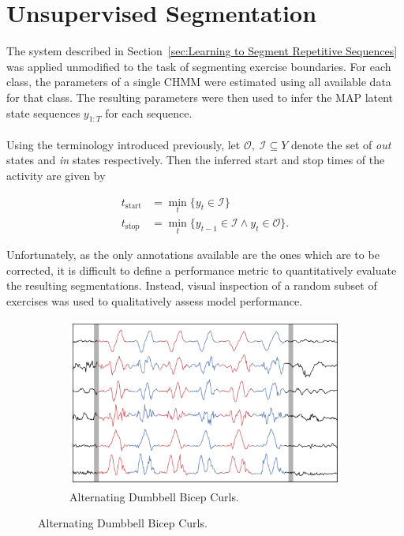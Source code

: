 \documentclass[12pt]{report}
\newcommand{\1}[0]{\mathbbm{1}}
\newcommand{\seq}[3]{\ensuremath{#1_{{#2}:{#3}}}}
\begin{document}
\section{Unsupervised Segmentation}
\label{sec:Unsupervised Segmentation}
The system described in Section~\ref{sec:Learning to Segment Repetitive Sequences} was applied unmodified
to the task of segmenting exercise boundaries. For each class, the parameters of a single \ac{CHMM}
were estimated using all available data for that class. The resulting parameters were then
used to infer the \ac{MAP} latent state sequences $\seq{y}{1}{T}$ for each sequence.
\\\\
Using the terminology introduced previously, let $\mathcal{O},\; \mathcal{I} \subseteq Y$
denote the set of \emph{out} states and \emph{in} states respectively.
Then the inferred start and stop times of the activity are given by

\begin{align*}
    t_\text{start} &= \min_t\{ y_t \in \mathcal{I}\} \\
    t_\text{stop} &= \min_t\{y_{t-1} \in \mathcal{I} \land y_t \in \mathcal{O}\}.
\end{align*}

Unfortunately, as the only annotations available are the ones which are to be corrected,
it is difficult to define a performance metric to quantitatively evaluate the resulting segmentations.
Instead, visual inspection of a random subset of exercises was used to qualitatively assess model performance.

\begin{figure}[H]
    \centering
    \begin{subfigure}{0.82\textwidth}
        \includegraphics[width=\textwidth]{img/segmentation/alt_db_bicep_curl.pdf}
        \caption{Alternating Dumbbell Bicep Curls.}
        \label{fig:actseg:alt-db-curl}
    \end{subfigure}
\end{figure}
\end{document}
